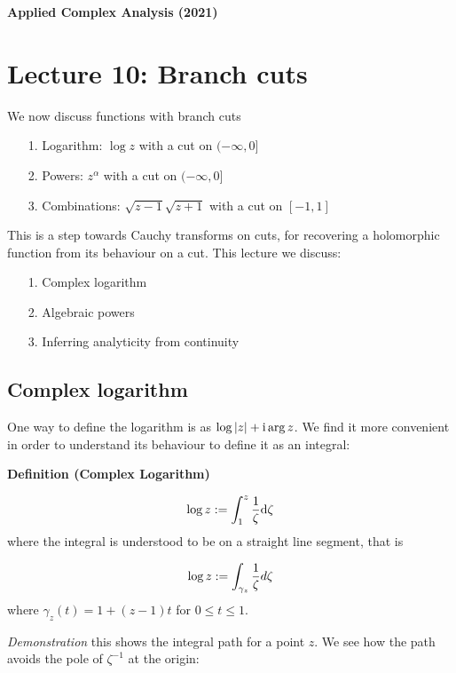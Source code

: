\documentclass[12pt,a4paper]{article}
\def\D{ {\rm d} }
\def\I{ {\rm i} }
\begin{document}
\textbf{Applied Complex Analysis (2021)}

\section{Lecture 10: Branch cuts}
We now discuss functions with branch cuts

\begin{itemize}
\item[1. ] Logarithm: $\log z$ with a cut on $(-\infty,0]$


\item[2. ] Powers: $z^\alpha$ with a cut on $(-\infty,0]$


\item[3. ] Combinations: $\sqrt{z-1}\sqrt{z+1}$ with a cut on $[-1,1]$

\end{itemize}
This is a step towards Cauchy transforms on cuts, for recovering a holomorphic function from its behaviour on a cut. This lecture we discuss:

\begin{itemize}
\item[1. ] Complex logarithm


\item[2. ] Algebraic powers


\item[3. ] Inferring analyticity from continuity

\end{itemize}
\subsection{Complex logarithm}
One way to define the logarithm is as $\log|z| + \I \arg z$. We find it more convenient in order to understand its behaviour to define it as an integral:

\textbf{Definition (Complex Logarithm)}

\[
\log z := \int_1^z {1 \over \zeta} \D\zeta
\]
where the integral is understood to be on a straight line segment, that is

\[
\log z := \int_{\gamma_z} {1 \over \zeta} d\zeta
\]
where $\gamma_z(t) = 1 + (z-1)t$ for $0 \leq t \leq 1$.

\emph{Demonstration} this shows the integral path for a point $z$. We see how the path avoids the pole of $\zeta^{-1}$ at the origin:
\end{document}

